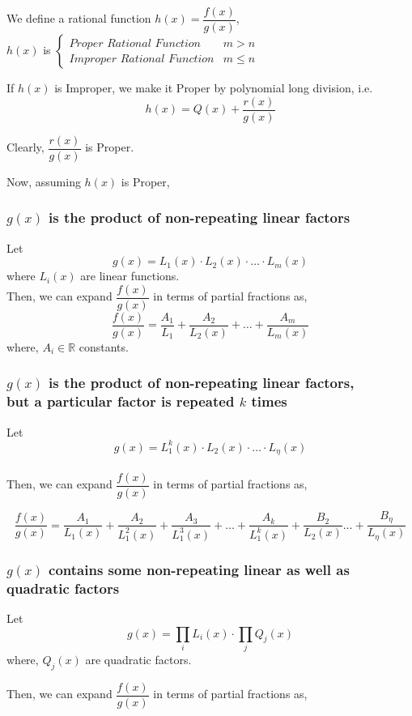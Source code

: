 \documentclass{article}
\begin{document}
We define a rational function $h(x)=\dfrac{f(x)}{g(x)}$, \\ $h(x)$ is $\begin{cases}
        \textit{Proper Rational Function}   & m>n     \\
        \textit{Improper Rational Function} & m \le n
    \end{cases}$

If $h(x)$ is Improper, we make it Proper by polynomial long division, i.e. $$h(x)=Q(x)+ \dfrac{r(x)}{g(x)}$$

Clearly, $\dfrac{r(x)}{g(x)}$ is Proper.


Now, assuming $h(x)$ is Proper,
\subsubsection{$g(x)$ is the product of non-repeating linear factors}
Let $$g(x)=L_{1}(x) \cdot L_{2}(x) \cdot  \ldots \cdot L_{m}(x)$$ where $L_{i}(x)$ are linear functions.\\
Then, we can expand $\dfrac{f(x)}{g(x)}$ in terms of partial fractions as,
$$\dfrac{f(x)}{g(x)}=\dfrac{A_{1}}{L_{1}}+\dfrac{A_{2}}{L_{2}(x)}+ \ldots + \dfrac{A_{m}}{L_{m}(x)}$$
where, $A_{i} \in \mathbb{R}$ constants.

\subsubsection{$g(x)$ is the product of non-repeating linear factors,\\ but a particular factor is repeated $k$ times}
Let $$g(x)=L_{1}^k(x) \cdot L_{2}(x) \cdot \ldots \cdot L_{\eta}(x)$$
\\Then, we can expand $\dfrac{f(x)}{g(x)}$ in terms of partial fractions as,

$$\dfrac{f(x)}{g(x)}=\dfrac{A_{1}}{L_{1}(x)}+\dfrac{A_{2}}{L_{1}^2(x)}+\dfrac{A_{3}}{L_{1}^3(x)}+\ldots + \dfrac{A_{k}}{L_{1}^k(x)}+\dfrac{B_{2}}{L_{2}(x)} \ldots +\dfrac{B_{\eta}}{L_{\eta}(x)}$$

\subsubsection{$g(x)$ contains some non-repeating linear as well as quadratic factors}
Let $$g(x)=\prod_{i} L_{i}(x) \cdot \prod_{j} Q_{j}(x)$$
where, $Q_{j}(x)$ are quadratic factors.

Then, we can expand $\dfrac{f(x)}{g(x)}$ in terms of partial fractions as,
\end{document}
